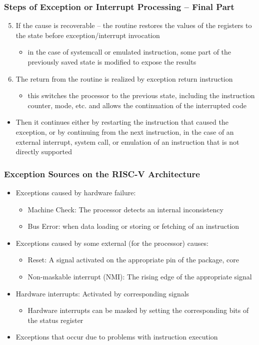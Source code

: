 \documentclass{beamer}
\begin{document}
\begin{frame}
\frametitle{Steps of Exception or Interrupt Processing -- Final Part}

\begin{enumerate}
 \setcounter{enumi}{4}
 \item If the cause is recoverable -- the routine restores the values ​​of the registers to the state before exception/interrupt invocation
 \begin{itemize}
  \item in the case of systemcall or emulated instruction, some part of the previously saved state is modified to expose the results
 \end{itemize}
 \item The return from the routine is realized by exception return instruction
 \begin{itemize}
  \item this switches the processor to the previous state, including the instruction counter, mode, etc. and allows the continuation of the interrupted code
 \end{itemize}
\end{enumerate}
\begin{itemize}
 \item Then it continues either by restarting the instruction that caused the exception, or by continuing from the next instruction, in the case of an external interrupt, system call, or emulation of an instruction that is not directly supported
\end{itemize}
\end{frame}

\begin{frame}
\frametitle{Exception Sources on the RISC-V Architecture}

\begin{itemize}
 \item Exceptions caused by hardware failure:
 \begin{itemize}
  \item Machine Check: The processor detects an internal inconsistency
  \item Bus Error: when data loading or storing or fetching of an instruction
 \end{itemize}
 \item Exceptions caused by some external (for the processor) causes:
 \begin{itemize}
  \item Reset: A signal activated on the appropriate pin of the package, core
  \item Non-maskable interrupt (NMI): The rising edge of the appropriate signal
 \end{itemize}
 \item Hardware interrupts: Activated by corresponding signals
 \begin{itemize}
  \item Hardware interrupts can be masked by setting the corresponding bits of the status register
 \end{itemize}
 \item Exceptions that occur due to problems with instruction execution
\end{itemize}
\end{frame}
\end{document}
